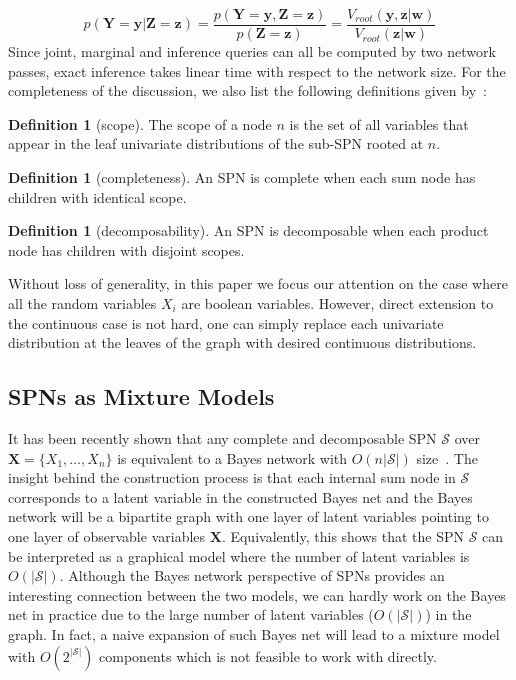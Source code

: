 \documentclass{article} %
\theoremstyle{definition}
\newtheorem{definition}[theorem]{Definition}
\begin{document}
\begin{equation*}
p(\mathbf{Y} =\mathbf{y}|\mathbf{Z}=\mathbf{z}) = \frac{p(\mathbf{Y}=\mathbf{y},\mathbf{Z}=\mathbf{z})}{p(\mathbf{Z}=\mathbf{z})} 
= \frac{V_{root}(\mathbf{y},\mathbf{z}|\mathbf{w})}{V_{root}(\mathbf{z}|\mathbf{w})}
\end{equation*}
Since joint, marginal and inference queries can all be computed by two network passes, exact inference takes linear time with respect to the network size. For the completeness of the discussion, we also list the following definitions given by~\citet{poon2011sum}:
\begin{definition}[scope]
The scope of a node $n$ is the set of all variables that appear in the leaf univariate distributions of the sub-SPN rooted at $n$.
\end{definition}
\begin{definition}[completeness]
An SPN is complete when each sum node has children with identical scope.
\end{definition}
\begin{definition}[decomposability] 
An SPN is decomposable when each product node has children with disjoint scopes.
\end{definition}
Without loss of generality, in this paper we focus our attention on the case where all the random variables $X_i$ are boolean variables. However, direct extension to the continuous case is not hard, one can simply replace each univariate distribution at the leaves of the graph with desired continuous distributions. 

\subsection{SPNs as Mixture Models}
It has been recently shown that any complete and decomposable SPN $\mathcal{S}$ over $\mathbf{X} =\{X_1,\ldots, X_n\}$ is equivalent to a Bayes network with $O(n|\mathcal{S}|)$ size~\cite{zhao2015spnbn}. The insight behind the construction process is that each internal sum node in $\mathcal{S}$ corresponds to a latent variable in the constructed Bayes net and the Bayes network will be a bipartite graph with one layer of latent variables pointing to one layer of observable variables $\mathbf{X}$. Equivalently, this shows that the SPN $\mathcal{S}$ can be interpreted as a graphical model where the number of latent variables is $O(|\mathcal{S}|)$. Although the Bayes network perspective of SPNs provides an interesting connection between the two models, we can hardly work on the Bayes net in practice due to the large number of latent variables ($O(|\mathcal{S}|)$) in the graph. In fact, a naive expansion of such Bayes net will lead to a mixture model with $O(2^{|\mathcal{S}|})$ components which is not feasible to work with directly. 
\end{document}
